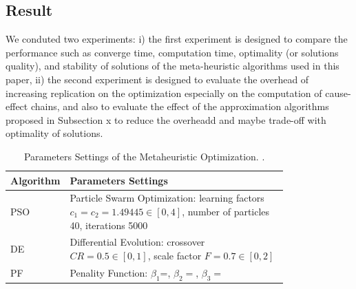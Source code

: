 \subsection{Result}
We conduted two experiments: i) the first experiment is designed to compare the performance  such as converge time, computation time, optimality (or solutions quality), and stability of solutions of the meta-heuristic algorithms used in this paper, ii) the second experiment is designed to evaluate the overhead of increasing replication on the optimization especially on the computation of cause-effect chains, and also to evaluate the effect of the approximation algorithms proposed in Subsection x to reduce the overheadd and maybe trade-off with optimality of solutions.
\begin{table}[h]
	\centering\small
	\begin{tabular}{@{}lp{0.8\linewidth}@{}}
		\toprule
		Algorithm & Parameters Settings\\ 
		\midrule
		PSO	& Particle Swarm Optimization: learning factors $c_1=c_2=1.49445\in [0,4]$,  number of particles 40, iterations 5000	\\
		DE	& Differential Evolution: crossover $CR=0.5\in[0,1]$, scale factor $F=0.7\in[0,2]$  \\
		PF& Penality Function:  $\beta_1$=,  $\beta_2=$, $ \beta_3=$\\
		\bottomrule
	\end{tabular}
	\caption{Parameters Settings of the Metaheuristic Optimization. .}
	\label{tbl_para}
\end{table}

